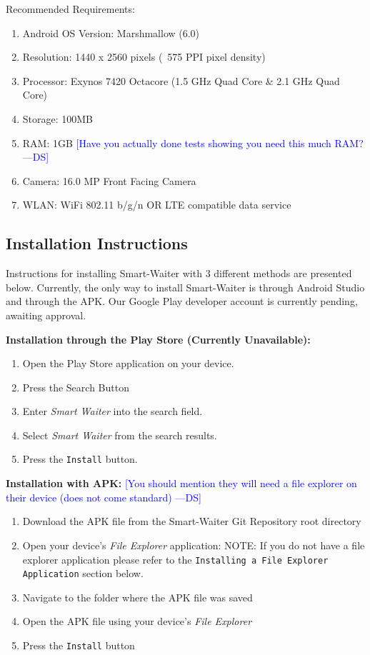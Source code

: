 \documentclass[12pt, titlepage]{article}
\newcommand{\authornote}[3]{\textcolor{#1}{[#3 ---#2]}}
\newcommand{\authornote}[3]{}
\newcommand{\ds}[1]{\authornote{blue}{DS}{#1}}
\begin{document}
Recommended Requirements:
\begin{enumerate}
\item Android OS Version: Marshmallow (6.0)
	\item Resolution: 1440 x 2560 pixels (~575 PPI pixel density)
	\item Processor: Exynos 7420 Octacore (1.5 GHz Quad Core \& 2.1 GHz Quad Core)
	\item Storage: 100MB
	\item RAM: 1GB \ds{Have you actually done tests showing you need this much RAM?}
	\item Camera: 16.0 MP Front Facing Camera
	\item WLAN: WiFi 802.11 b/g/n OR LTE compatible data service	
\end{enumerate}

\subsection{Installation Instructions}
Instructions for installing Smart-Waiter with 3 different methods are presented below. Currently, the only way to install Smart-Waiter is through Android Studio and through the APK. Our Google Play developer account is currently pending, awaiting approval.

\textbf{\newline Installation through the Play Store (Currently Unavailable):}
	\begin{enumerate}
		\item Open the Play Store application on your device.
		\item Press the Search Button
		\item Enter \emph{Smart Waiter} into the search field.
		\item Select \emph{Smart Waiter} from the search results.
		\item Press the \texttt{Install} button.		
	\end{enumerate}

\textbf{\newline Installation with APK:}
	\ds{You should mention they will need a file explorer on their device (does not come standard)}
	\begin{enumerate}
		\item Download the APK file from the Smart-Waiter Git Repository root directory
		\item Open your device's \emph{File Explorer} application: NOTE: If you do not have a file explorer application please refer to the \texttt{Installing a File Explorer Application} section below.
		\item Navigate to the folder where the APK file was saved
		\item Open the APK file using your device's \emph{File Explorer}
		\item Press the \texttt{Install} button
	\end{enumerate}
\end{document}
